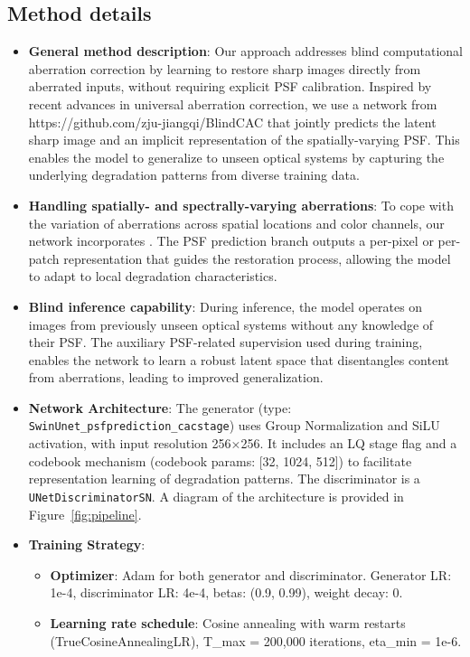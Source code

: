 \documentclass[10pt,twocolumn,letterpaper]{article}
\begin{document}
\subsection{Method details}
\begin{itemize}
    \item \textbf{General method description}: Our approach addresses blind computational aberration correction by learning to restore sharp images directly from aberrated inputs, without requiring explicit PSF calibration. Inspired by recent advances in universal aberration correction, we use a network from https://github.com/zju-jiangqi/BlindCAC that jointly predicts the latent sharp image and an implicit representation of the spatially-varying PSF. This enables the model to generalize to unseen optical systems by capturing the underlying degradation patterns from diverse training data.
    \item \textbf{Handling spatially- and spectrally-varying aberrations}: To cope with the variation of aberrations across spatial locations and color channels, our network incorporates . The PSF prediction branch outputs a per-pixel or per-patch representation that guides the restoration process, allowing the model to adapt to local degradation characteristics.
    \item \textbf{Blind inference capability}: During inference, the model operates on images from previously unseen optical systems without any knowledge of their PSF. The auxiliary PSF-related supervision used during training, enables the network to learn a robust latent space that disentangles content from aberrations, leading to improved generalization.
    \item \textbf{Network Architecture}: The generator (type: \texttt{SwinUnet\_psfprediction\_cacstage}) uses Group Normalization and SiLU activation, with input resolution 256×256. It includes an LQ stage flag and a codebook mechanism (codebook params: [32, 1024, 512]) to facilitate representation learning of degradation patterns. The discriminator is a \texttt{UNetDiscriminatorSN}. A diagram of the architecture is provided in Figure~\ref{fig:pipeline}.
    \item \textbf{Training Strategy}:
        \begin{itemize}
            \item \textbf{Optimizer}: Adam for both generator and discriminator. Generator LR: 1e-4, discriminator LR: 4e-4, betas: (0.9, 0.99), weight decay: 0.
            \item \textbf{Learning rate schedule}: Cosine annealing with warm restarts (TrueCosineAnnealingLR), T\_max = 200,000 iterations, eta\_min = 1e-6.

\end{itemize}
\end{itemize}
\end{document}
